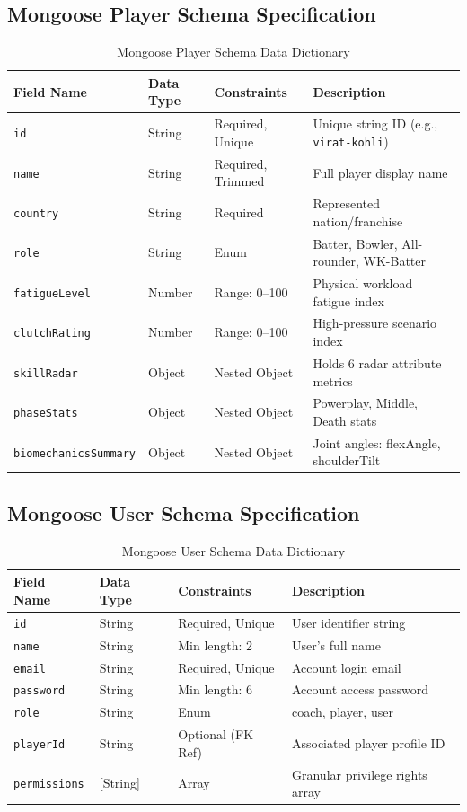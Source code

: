 \documentclass[12pt,a4paper]{report}
\begin{document}
\subsection{Mongoose Player Schema Specification}
\begin{table}[H]
\centering
\caption{Mongoose Player Schema Data Dictionary}
\label{tab:player_schema}
\begin{tabular}{llll}
\toprule
\textbf{Field Name} & \textbf{Data Type} & \textbf{Constraints} & \textbf{Description} \\
\midrule
\texttt{id} & String & Required, Unique & Unique string ID (e.g., \texttt{virat-kohli}) \\
\texttt{name} & String & Required, Trimmed & Full player display name \\
\texttt{country} & String & Required & Represented nation/franchise \\
\texttt{role} & String & Enum & Batter, Bowler, All-rounder, WK-Batter \\
\texttt{fatigueLevel} & Number & Range: 0--100 & Physical workload fatigue index \\
\texttt{clutchRating} & Number & Range: 0--100 & High-pressure scenario index \\
\texttt{skillRadar} & Object & Nested Object & Holds 6 radar attribute metrics \\
\texttt{phaseStats} & Object & Nested Object & Powerplay, Middle, Death stats \\
\texttt{biomechanicsSummary}& Object & Nested Object & Joint angles: flexAngle, shoulderTilt \\
\bottomrule
\end{tabular}
\end{table}

\subsection{Mongoose User Schema Specification}
\begin{table}[H]
\centering
\caption{Mongoose User Schema Data Dictionary}
\label{tab:user_schema}
\begin{tabular}{llll}
\toprule
\textbf{Field Name} & \textbf{Data Type} & \textbf{Constraints} & \textbf{Description} \\
\midrule
\texttt{id} & String & Required, Unique & User identifier string \\
\texttt{name} & String & Min length: 2 & User's full name \\
\texttt{email} & String & Required, Unique & Account login email \\
\texttt{password} & String & Min length: 6 & Account access password \\
\texttt{role} & String & Enum & coach, player, user \\
\texttt{playerId} & String & Optional (FK Ref) & Associated player profile ID \\
\texttt{permissions} & [String] & Array & Granular privilege rights array \\
\bottomrule
\end{tabular}
\end{table}
\end{document}
